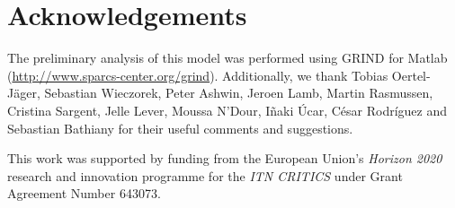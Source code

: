 \section{Acknowledgements}
\label{sec:Acknowledgements}
The preliminary analysis of this model was performed using GRIND for Matlab (\url{http://www.sparcs-center.org/grind}). Additionally, we thank Tobias Oertel-Jäger, Sebastian Wieczorek, Peter Ashwin, Jeroen Lamb, Martin Rasmussen, Cristina Sargent, Jelle Lever, Moussa N'Dour, Iñaki Úcar, César Rodríguez and Sebastian Bathiany for their useful comments and suggestions. 

This work was supported by funding from the European Union's \textit{Horizon 2020} research and innovation programme for the \textit{ITN CRITICS} under Grant Agreement Number 643073.
